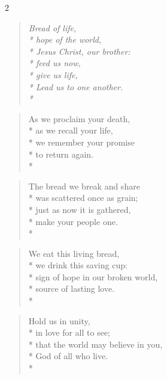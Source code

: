 \documentclass[12pt]{article}
\newcounter{count}
\newcommand\printcount{\addtocounter{count}{1}\thecount}
\begin{document}
\begin{multicols}{2}
\setcounter{count}{0}
\begin{verse}
\textit{Bread of life,\\*
hope of the world,\\*
Jesus Christ, our brother:\\*
feed us now,\\*
give us life,\\*
Lead us to one another.\\*}
\end{verse}

\begin{verse}
\flagverse{\printcount.} As we proclaim your death,\\*
as we recall your life,\\*
we remember your promise\\*
to return again.\\*
\end{verse}

\begin{verse}
\flagverse{\printcount.} The bread we break and share\\*
was scattered once as grain;\\*
just as now it is gathered,\\*
make your people one.\\*
\end{verse}

\begin{verse}
\flagverse{\printcount.} We eat this living bread,\\*
we drink this saving cup:\\*
sign of hope in our broken world,\\*
source of lasting love.\\*
\end{verse}

\begin{verse}
\flagverse{\printcount.} Hold us in unity,\\*
in love for all to see;\\*
that the world may believe in you,\\*
God of all who live.\\*
\end{verse}
\end{multicols}
\end{document}
